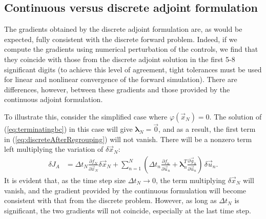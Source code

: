 \documentclass[twocolumn,numbook]{svjour3}          %
\newcommand{\fsum}[3]{\sum_{#1}^{#2}{#3}}
\newcommand{\pder}[2]{\frac{\partial #1}{\partial #2}}
\def\u{{\vec u}}
\def\x{{\vec x}}
\def\p{{\vec{g}}}
\def\0{{\vec 0}}
\def\blambda{{\pmb{\lambda}}}%
\def\M{{\varphi}}
\def\F{f}
\def\myobj{J}
\begin{document}
\subsection{Continuous versus discrete adjoint formulation}
The gradients obtained by the discrete adjoint formulation are, as would be
expected, fully consistent with the discrete forward problem. Indeed, if we
compute the gradients using numerical perturbation of the controls, we find that
they coincide with those from the discrete adjoint solution in the first 5-8
significant digits (to achieve this level of agreement, tight tolerances must be
used for linear and nonlinear convergence of the forward simulation). There are differences, however,
between these gradients and those provided by the continuous adjoint
formulation.

To illustrate this, consider
the simplified case where $\M(\x_N) = 0$. The solution of
(\ref{eq:terminatingbc}) in this case will give $\blambda_N = \0$,
and as a result, the first term in (\ref{eq:discreteAfterRegrouping})
will not vanish. There will be a nonzero term left multiplying the
variation of $\delta \x_N$:
%
\begin{align}
\label{eq:discreteAfterRegroupingWithContinuousBC}
  \delta \myobj_A &=
  \Delta t_N \pder{\F_N}{\x_N} \delta \x_N
  +\fsum{n=1}{N}{
      \left (
        \Delta t_n \pder{\F_n}{\u_n}
        +\blambda^T_n\pder{\p_n}{\u_n}
      \right ) \, \delta \u_n.
    }
\end{align}
It is evident that, as the time step size $\Delta t_N \rightarrow 0$,
the term multiplying $\delta \x_N$ will vanish, and the gradient provided by the continuous
formulation will become consistent with that from the discrete problem.
However, as long as $\Delta t_N$ is significant, the two gradients
will not coincide, especially at the last time step.
\end{document}
